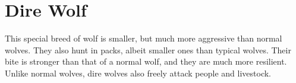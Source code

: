 \section{Dire Wolf}

This special breed of wolf is smaller, but much more aggressive than normal wolves. They also hunt in packs, albeit smaller ones than typical wolves. Their bite is stronger than that of a normal wolf, and they are much more resilient. Unlike normal wolves, dire wolves also freely attack people and livestock.